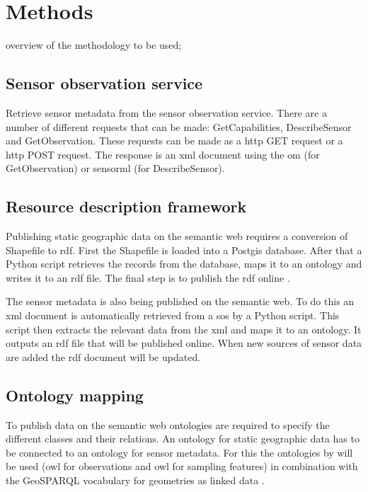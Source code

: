 \chapter{Methods}
\label{chap:methods}

overview of the methodology to be used;

\section{Sensor observation service}
Retrieve sensor metadata from the sensor observation service. There are a number of different requests that can be made: GetCapabilities, DescribeSensor and GetObservation. These requests can be made as a \ac{http} GET request or a \ac{http} POST request. The response is an \ac{xml} document using the \ac{om} (for GetObservation) or \ac{sensorml} (for DescribeSensor).

\section{Resource description framework}
Publishing static geographic data on the semantic web requires a conversion of Shapefile to \ac{rdf}. First the Shapefile is loaded into a Postgis database. After that a Python script retrieves the records from the database, maps it to an ontology and writes it to an \ac{rdf} file. The final step is to publish the \ac{rdf} online \citep{LD:Missier}. 

The sensor metadata is also being published on the semantic web. To do this an \ac{xml} document is automatically retrieved from a \ac{sos} by a Python script. This script then extracts the relevant data from the \ac{xml} and maps it to an ontology. It outputs an \ac{rdf} file that will be published online. When new sources of sensor data are added the \ac{rdf} document will be updated.   

\section{Ontology mapping}
To publish data on the semantic web ontologies are required to specify the different classes and their relations. An ontology for static geographic data has to be connected to an ontology for sensor metadata. For this the ontologies by \cite{SSW:Cox4} will be used (\ac{owl} for observations and \ac{owl} for sampling features) in combination with the GeoSPARQL vocabulary for geometries as linked data \citep{LD:OGC}.  

